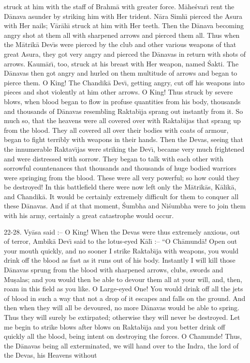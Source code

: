 struck at him with the staff of Brahm\=a with greater force. M\=ahe\'svar\={\i} rent the D\=anava asunder by striking him with Her trident. N\=ara Simh\={\i} pierced the Asura with Her nails; V\=ar\=ah\={\i} struck at him with Her teeth. Then the D\=anava becoming angry shot at them all with sharpened arrows and pierced them all. Thus when the M\=atrik\=a Dev\={\i}s were pierced by the club and other various weapons of that great Asura, they got very angry and pierced the D\=anavas in return with shots of arrows. Kaum\=ar\={\i}, too, struck at his breast with Her weapon, named \'Sakti. The D\=anavas then got angry and hurled on them multitude of arrows and began to pierce them. O King! The Chandik\=a Dev\={\i}, getting angry, cut off his weapons into pieces and shot violently at him other arrows. O King! Thus struck by severe blows, when blood began to flow in profuse quantities from his body, thousands and thousands of D\=anavas resembling Raktab\={\i}ja sprang out instantly from it. So much so, that the heavens were all covered over with Raktab\={\i}jas that sprang up from the blood. They all covered all over their bodies with coats of armour, began to fight terribly with weapons in their hands. Then the Devas, seeing that the innumerable Raktav\={\i}jas were striking the Dev\={\i}, became very much frightened and were distressed with sorrow. They began to talk with each other with sorrowful countenances that thousands and thousands of huge bodied warriors were springing from the blood. These were all very powerful; so how could they be destroyed! In this battlefield there were now left only the M\=atrik\=as, K\=alik\=a, and Chandik\=a. It would be certainly extremely difficult for them to conquer all these D\=anavas. And if at that moment, \'Sumbha and Ni\'sumbha were to join them with his army, certainly a great catastrophe would occur.

22-28. Vy\=asa said :-- O King! When the Devas were thus extremely anxious, out of terror, Ambik\=a Dev\={\i} said to the lotus-eyed K\=al\={\i} :-- ``O Ch\=amund\=a! Open out your mouth quickly, and no sooner I strike Raktab\={\i}ja with weapons, you would drink off the blood as fast as it runs out of his body. Instantly I will kill those D\=anavas sprung from the blood with sharpened arrows, clubs, swords and Mu\d{s}alas; and you would then be able to devour them all at your will, and, then, roam in this field as you like. O Large-eyed One! You would drink off all the jets of blood in such a way that not a drop of it escapes and falls on the ground. And then when they will all be devoured, no more D\=anavas would be able to spring. Thus they will surely be extirpated; otherwise they will never be destroyed. Let me begin to strike blows after blows on Raktab\={\i}ja and you better drink off quickly all the blood, being intent on destroying the forces. O Chamunde! Thus, the D\=anavas being all exterminated, we will hand over to the Indra, the lord of the Devas, his Heavens without

